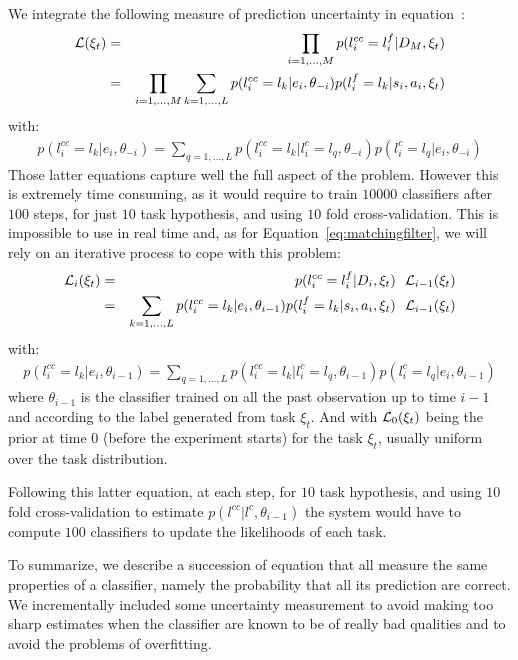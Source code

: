 We integrate the following measure of prediction uncertainty in equation~\label{eq:matching}:
%
\begin{eqnarray}
\mathcal{L}(\xi_t) &=& \prod_{i = 1,\ldots,M} p(l^{cc}_i = l^f_i | D_M, \xi_t) \nonumber \\ 
&=& \prod_{i = 1,\ldots,M} \sum_{k = 1, \ldots, L} p(l^{cc}_i = l_k | e_i, \theta_{-i}) p(l^f_i = l_k | s_i, a_i, \xi_t)
\label{eq:matchingcrossvalidation} 
\end{eqnarray}
%
with:
%
\begin{eqnarray}
p(l^{cc}_i = l_k | e_i, \theta_{-i}) =  \sum_{q = 1, \ldots, L} p(l^{cc}_i = l_k| l^c_i = l_q, \theta_{-i}) p(l^c_i = l_q | e_i, \theta_{-i})
\label{eq:confusion} 
\end{eqnarray}
%
Those latter equations capture well the full aspect of the problem. However this is extremely time consuming, as it would require to train $10000$ classifiers after $100$ steps, for just $10$ task hypothesis, and using $10$ fold cross-validation. This is impossible to use in real time and, as for Equation~\ref{eq:matchingfilter}, we will rely on an iterative process to cope with this problem:
%
\begin{eqnarray}
\mathcal{L}_i(\xi_t) &=& p(l^{cc}_i = l^f_i | D_i, \xi_t) ~~ \mathcal{L}_{i-1}(\xi_t) \nonumber \\ 
&=& \sum_{k = 1, \ldots, L} p(l^{cc}_i = l_k | e_i, \theta_{i-1}) p(l^f_i = l_k | s_i, a_i, \xi_t) ~~ \mathcal{L}_{i-1}(\xi_t)
\label{eq:matchingfiltercrossvalidation} 
\end{eqnarray}
%
with:
%
\begin{eqnarray}
p(l^{cc}_i = l_k | e_i, \theta_{i-1}) =  \sum_{q = 1, \ldots, L} p(l^{cc}_i = l_k| l^c_i = l_q, \theta_{i-1}) p(l^c_i = l_q | e_i, \theta_{i-1})
\label{eq:confusionfilter} 
\end{eqnarray}
%
where $\theta_{i-1}$ is the classifier trained on all the past observation up to time $i-1$and according to the label generated from task $\xi_t$. And with $\mathcal{L}_{0}(\xi_t)$ being the prior at time 0 (before the experiment starts) for the task $\xi_t$, usually uniform over the task distribution.

Following this latter equation, at each step, for $10$ task hypothesis, and using $10$ fold cross-validation to estimate $p(l^{cc} | l^c, \theta_{i-1})$ the system would have to compute $100$ classifiers to update the likelihoods of each task.

\transition

To summarize, we describe a succession of equation that all measure the same properties of a classifier, namely the probability that all its prediction are correct. We incrementally included some uncertainty measurement to avoid making too sharp estimates when the classifier are known to be of really bad qualities and to avoid the problems of overfitting.

